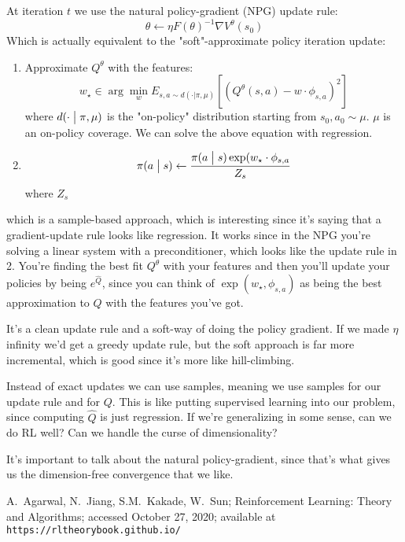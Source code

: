\documentclass[12pt,reqno]{amsart}
\newcommand{\cond}[2]{( {#1} \bigm\vert {#2})}
\newcommand{\smcond}[2]{( {#1} \vert {#2})}
\begin{document}
At iteration $t$ we use the natural policy-gradient (NPG) update rule:
\begin{equation}
\theta \leftarrow \eta F(\theta)^{-1}\nabla V^\theta(s_0)
\end{equation}
Which is actually equivalent to the "soft"-approximate policy iteration update:
\begin{enumerate}[1.]
\item Approximate $Q^\theta$ with the features:
\begin{equation}
w_\star \in \arg \min_{w} E_{s,a\sim d\smcond{\cdot}{\pi,\mu}}\left[ (Q^\theta (s,a) - w \cdot \phi_{s,a})^2 \right]
\end{equation} where $d\cond{\cdot}{\pi,\mu}$ is the "on-policy" distribution starting from $s_0,a_0 \sim \mu$. $\mu$ is an on-policy coverage. We can solve the above equation with regression.\\
\item \begin{equation}
\pi\cond{a}{s} \leftarrow \frac{\pi\cond{a}{s} \exp(w_\star \cdot \phi_{s,a}}{Z_{s}}
\end{equation}
where $Z_{s}$\\
\end{enumerate}
which is a sample-based approach, which is interesting since it's saying that a gradient-update rule looks like regression. It works since in the NPG you're solving a linear system with a preconditioner, which looks like the update rule in 2. You're finding the best fit $Q^\theta$ with your features and then you'll update your policies by being $e^{\hat{Q}}$, since you can think of $\exp(w_\star,\phi_{s,a})$ as being the best approximation to $Q$ with the features you've got.

It's a clean update rule and a soft-way of doing the policy gradient. If we made $\eta$ infinity we'd get a greedy update rule, but the soft approach is far more incremental, which is good since it's more like hill-climbing. 

Instead of exact updates we can use samples, meaning we use samples for our update rule and for $Q$. This is like putting supervised learning into our problem, since computing $\hat{Q}$ is just regression. If we're generalizing in some sense, can we do RL well? Can we handle the curse of dimensionality? 

It's important to talk about the natural policy-gradient, since that's what gives us the dimension-free convergence that we like.

\begin{thebibliography}{99}

 A.\ Agarwal, N.\ Jiang, S.M.\ Kakade, W.\ Sun; Reinforcement Learning: Theory and Algorithms; accessed October 27, 2020; available at \texttt{https://rltheorybook.github.io/}
\end{thebibliography}
\end{document}
